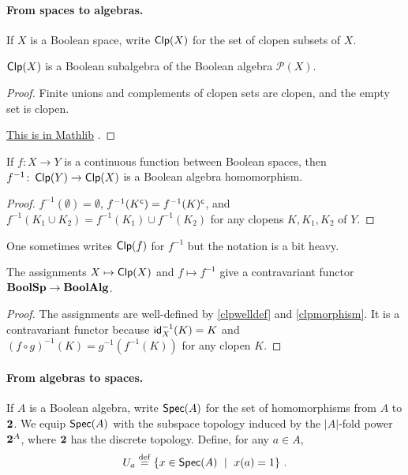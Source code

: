 \documentclass[a4paper,10pt]{article}
\numberwithin{theorem}{section}
\newcommand{\docref}[3]{
    \href{
        https://leanprover-community.github.io/mathlib4_docs/Mathlib/#1.html\##2
    }{#3}
}
\begin{document}
\paragraph{From spaces to algebras.}
If $X$ is a Boolean space, write $\operatorname*{\mathsf{Clp}}(X)$ for the set of clopen
subsets of $X$. 

\begin{proposition}\label{clpwelldef}
    $\operatorname*{\mathsf{Clp}}(X)$ is a Boolean subalgebra of the Boolean algebra $\mathcal{P}(X)$.
\end{proposition}
\begin{proof}
    Finite unions and complements of clopen sets are clopen, and the empty set
    is clopen.
    \docref{Topology/Sets/Closeds}{TopologicalSpace.Clopens.instBooleanAlgebraClopens}{This
    is in Mathlib}.
\end{proof} 
\begin{proposition}\label{clpmorphism}
    If $f \colon X \to Y$ is a continuous function between Boolean spaces, then
    $f^{-1} \colon \operatorname*{\mathsf{Clp}}(Y) \to \operatorname*{\mathsf{Clp}}(X)$ is a Boolean algebra homomorphism.
\end{proposition}
\begin{proof}
    $f^{-1}(\emptyset) = \emptyset$, $f^{-1}(K^{\mathsf{c}}) = f^{-1}(K)^{\mathsf{c}}$, and
    $f^{-1}(K_1 \cup K_2) = f^{-1}(K_1) \cup f^{-1}(K_2)$ for any clopens $K,
    K_1, K_2$ of $Y$. 
\end{proof}
One sometimes writes $\operatorname*{\mathsf{Clp}}(f)$ for $f^{-1}$ but the notation is a bit heavy.
\begin{proposition}
    The assignments $X \mapsto \operatorname*{\mathsf{Clp}}(X)$ and $f \mapsto f^{-1}$ give a
contravariant functor $\mathbf{BoolSp} \to \mathbf{BoolAlg}$.
\end{proposition}
\begin{proof}
    The assignments are well-defined by \cref{clpwelldef} and
    \cref{clpmorphism}. It is a contravariant functor because
    $\mathsf{id}_X^{-1}(K) = K$ and $(f \circ g)^{-1}(K) = g^{-1}(f^{-1}(K))$ for
    any clopen $K$.
\end{proof}

\paragraph{From algebras to spaces.}
If $A$ is a Boolean algebra, write $\operatorname*{\mathsf{Spec}}(A)$ for the set of homomorphisms from
$A$ to $\mathbf{2}$. We equip $\operatorname*{\mathsf{Spec}}(A)$ with the subspace topology induced by the
$|A|$-fold power $\mathbf{2}^{A}$, where $\mathbf{2}$ has the discrete topology.
Define, for any $a \in A$,
\[ U_a \stackrel{\mathrm{def}}{=} \{ x \in \operatorname*{\mathsf{Spec}}(A) \ \mid \ x(a) = 1 \} \ . \]
\end{document}
